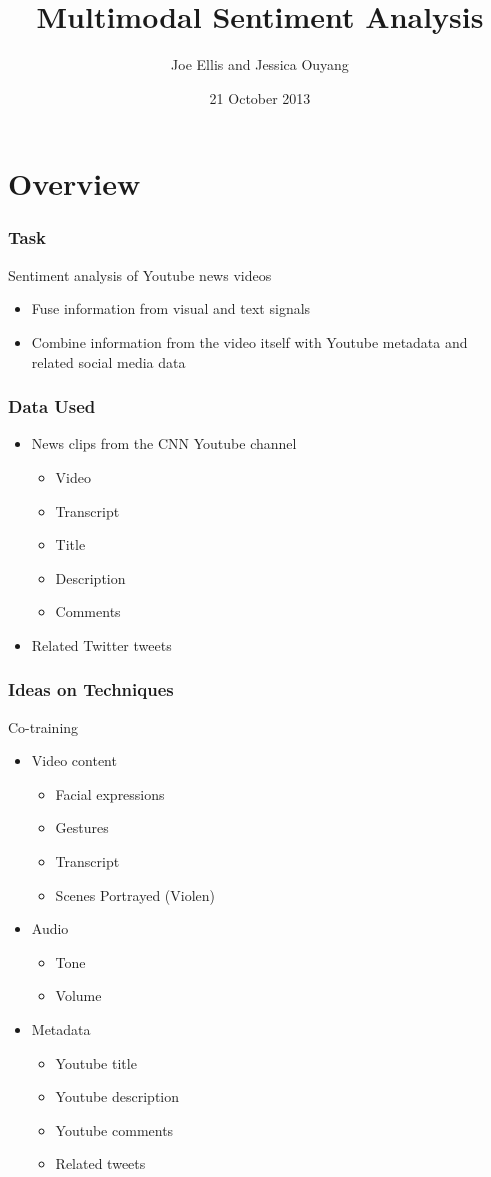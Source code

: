 \documentclass[brown]{beamer}
\title{Multimodal Sentiment Analysis}
\author{Joe Ellis and Jessica Ouyang}
\institute{Columbia University}
\date{21 October 2013}
\begin{document}
\begin{frame}
  \titlepage
\end{frame}

\section{Overview}

\begin{frame}
  \frametitle{Task}
  Sentiment analysis of Youtube news videos
  \begin{itemize}
  \item Fuse information from visual and text signals
  \item Combine information from the video itself with Youtube metadata and related social media data
  \end{itemize}
\end{frame}

\begin{frame}
  \frametitle{Data Used}
  \begin{itemize}
  \item News clips from the CNN Youtube channel
    \begin{itemize}
    \item Video
    \item Transcript
    \item Title
    \item Description
    \item Comments
    \end{itemize}
  \item Related Twitter tweets
  \end{itemize}
\end{frame}

\begin{frame}
  \frametitle{Ideas on Techniques}
  Co-training
  \begin{itemize}
  \item Video content
    \begin{itemize}
    \item Facial expressions
    \item Gestures
    \item Transcript
    \item Scenes Portrayed (Violen)
    \end{itemize}
  \item{Audio}
    \begin{itemize}
    \item{Tone}
    \item{Volume}
    \end{itemize}
  \item Metadata
    \begin{itemize}
      \item Youtube title
      \item Youtube description
      \item Youtube comments
      \item Related tweets
    \end{itemize}
  \end{itemize}
\end{frame}
\end{document}
